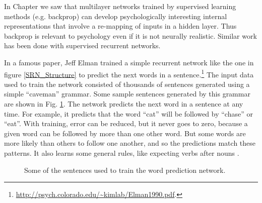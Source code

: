 
In Chapter  we saw that multilayer networks trained by supervised learning methods (e.g. backprop) can develop psychologically interesting internal representations that involve a re-mapping of inputs in a hidden layer. Thus backprop is relevant to psychology even if it is not neurally realistic. Similar work has been done with supervised recurrent networks. 

In a famous paper, Jeff Elman trained a simple recurrent network like the one in figure \ref{SRN_Structure} to predict the next words in a sentence.\footnote{\url{http://psych.colorado.edu/~kimlab/Elman1990.pdf}.}  The input data used to train the network consisted of thousands of sentences generated using a simple ``caveman'' grammar. Some sample sentences generated by this grammar are shown in Fig. \ref{elman_sentences}. The network predicts the next word in  a sentence at any time. For example, it predicts that the word ``cat'' will be followed by ``chase'' or ``eat''. With training, error can be reduced, but it never goes to zero, because a given word can be followed by more than one other word. But some words are more likely than others to follow one another, and so the predictions match these patterns. It also learns some general rules, like expecting verbs after nouns \cite{elman1990finding}. 

\begin{figure}[h]
\centering
{}
\caption[Generated by Jeff Yoshimi based on \cite{elman1990finding}.]{Some of the sentences used to train the word prediction network.}
\label{elman_sentences}
\end{figure}


